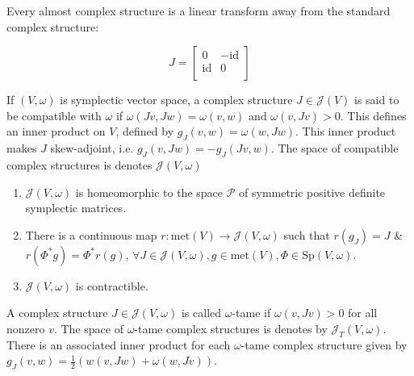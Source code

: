\begin{prop}

Every almost complex structure is a linear transform away from the standard complex structure:

\[
J = \begin{bmatrix}
     0 & -\mathrm{id} \\
     \mathrm{id} & 0 \\
\end{bmatrix}
\]

\end{prop}

\begin{defn}

If $(V,\omega)$ is symplectic vector space, a complex structure $J \in \mathcal{J}(V)$ is said to be compatible with $\omega$ if $\omega(Jv, Jw) = \omega(v,w)$ and $\omega(v,Jv) > 0$. This defines an inner product on $V$, defined by $g_J(v,w) = \omega(w,Jw)$. This inner product makes $J$ skew-adjoint, i.e. $g_J(v,Jw) = - g_J(Jv, w)$. The space of compatible complex structures is denotes $\mathcal{J}(V,\omega)$
\end{defn}

\begin{prop}

\begin{enumerate}
    \item $\mathcal{J}(V,\omega)$ is homeomorphic to the space $\mathcal{P}$ of symmetric positive definite symplectic matrices.
    \item There is a continuous map $r:\text{met}(V) \to \mathcal{J}(V,\omega)$ such that $r(g_J) = J$ \& $r(\Phi^* g) = \Phi^* r(g)$, $\forall J \in \mathcal{J}(V,\omega), g \in \text{met}(V), \Phi \in \text{Sp}(V,\omega)$.
    \item $\mathcal{J}(V,\omega)$ is contractible.
    
    
\end{enumerate}

\end{prop}

\begin{defn}

A complex structure $J \in \mathcal{J}(V,\omega)$ is called $\omega$-tame if $\omega(v,Jv) > 0$ for all nonzero $v$. The space of $\omega$-tame complex structures is denotes by $\mathcal{J}_T(V, \omega)$. There is an associated inner product for each $\omega$-tame complex structure given by $g_J(v,w) = \frac{1}{2}(w(v,Jw) + \omega(w,Jv))$.

\end{defn}

